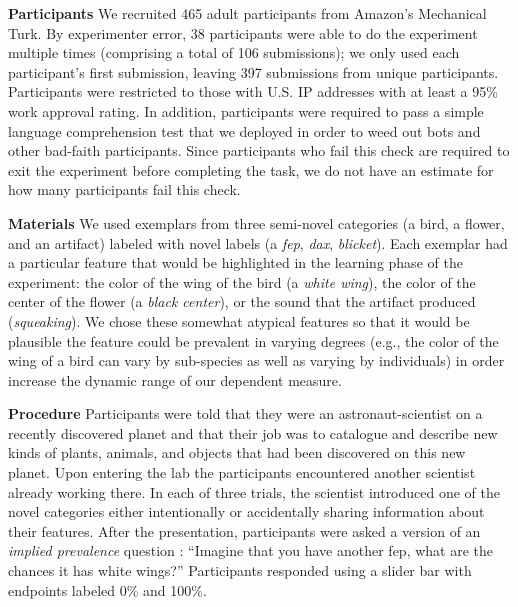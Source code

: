 \documentclass[10pt,letterpaper]{article}
\begin{document}
\noindent\textbf{Participants}
We recruited 465 adult participants from Amazon's Mechanical Turk. 
By experimenter error, 38 participants were able to do the experiment multiple times (comprising a total of 106 submissions); we only used each participant's first submission, leaving 397 submissions from unique participants. 
Participants were restricted to those with U.S. IP addresses with at least a 95\% work approval rating. 
In addition, participants were required to pass a simple language comprehension test that we deployed in order to weed out bots and other bad-faith participants. 
Since participants who fail this check are required to exit the experiment before completing the task, we do not have an estimate for how many participants fail this check. 



\noindent\textbf{Materials}
We used exemplars from three semi-novel categories (a bird, a flower, and an artifact) labeled with novel labels (a \emph{fep}, \emph{dax}, \emph{blicket}).
Each exemplar had a particular feature that would be highlighted in the learning phase of the experiment: the color of the wing of the bird (a \emph{white wing}), the color of the center of the flower (a \emph{black center}), or the sound that the artifact produced (\emph{squeaking}). 
We chose these somewhat atypical features so that it would be plausible the feature could be prevalent in varying degrees (e.g., the color of the wing of a bird can vary by sub-species as well as varying by individuals) in order increase the dynamic range of our dependent measure. 

\noindent\textbf{Procedure}
Participants were told that they were an astronaut-scientist on a recently discovered planet and that their job was to catalogue and describe new kinds of plants, animals, and objects that had been discovered on this new planet.  
Upon entering the lab the participants encountered another scientist already working there. 
In each of three trials, the scientist introduced one of the novel categories either intentionally or accidentally sharing information about their features. 
After the presentation, participants were asked a version of an \emph{implied prevalence} question \cite{Gelman2002, Cimpian2010a, tessler2020learning}: ``Imagine that you have another fep, what are the chances it has white wings?'' 
Participants responded using a slider bar with endpoints labeled 0\% and 100\%.
\end{document}
